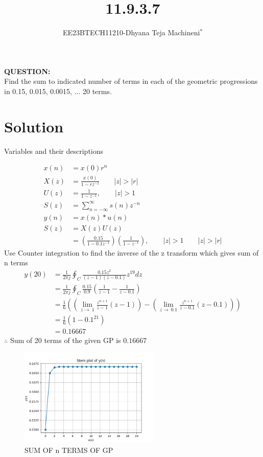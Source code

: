 \documentclass[journal,12pt,twocolumn]{IEEEtran}
\theoremstyle{remark}
\begin{document}

\vspace{3cm}
\title{\textbf{11.9.3.7}}
\author{EE23BTECH11210-Dhyana Teja Machineni$^{*}$%
}
\maketitle
\newpage
\bigskip

\textbf{QUESTION:}\\
Find the sum to indicated number of terms in each of the geometric progressions in
0.15, 0.015, 0.0015, ... 20 terms.
\section*{Solution}
 
\begin{flushleft}
     \begin{table}[h]
         \caption{Variables and their descriptions}
         \label{tab:table2}
         
     \end{table}
 \end{flushleft}
\begin{align}
x(n) &= x(0)r^n \\
X(z) &= \frac{x(0)}{1-rz^{-1}} \qquad |z| > |r| \\
U(z)&=\frac{1}{1-z^{-1}}, \qquad |z|>1\\
S(z)&=\sum_{n=-\infty}^{\infty}s(n) z^{-n}\\
y(n)&= x(n)*u(n)\\
S(z)&=X(z)U(z)\\
&= \left( \frac{0.15}{1-0.1z^{-1}}\right)\left(\frac{1}{1-z^{-1}} \right),\qquad |z| > 1  \qquad |z|>|r|
\end{align}
Use Counter integration to find the inverse of the z transform which gives sum of n terms
\begin{align}
y(20)&=\frac{1}{2\pi j}\oint_C \frac{0.15 z^2}{(z-1)(z-0.1)}z^{19} dz\\
&=\frac{1}{2 \pi j}\oint_C \frac{0.15}{0.9} \left(\frac{1}{z-1} - \frac{1}{z-0.1} \right)\\
&= \frac{1}{6} \left(\left(\lim_{z\to \ 1}\frac{z^{n+1}}{z-1} (z-1) \right)-\left(\lim_{z \to \ 0.1}\frac{z^{n+1}}{z-0.1} (z-0.1)\right)\right)\\
&= \frac{1}{6}(1- 0.1^{21})\\
    &=0.16667
\end{align}
        $\therefore$ Sum of 20 terms of the given GP is $0.16667$
       \renewcommand{\thefigure}{\theenumi}
 \renewcommand{\thetable}{\theenumi}
\begin{figure}[h]
  \centering
  \includegraphics[width=0.6\textwidth]{figs/graph.png}
  \caption{SUM OF n TERMS OF GP}
  \label{fig:your_label}
\end{figure}
\end{document}
